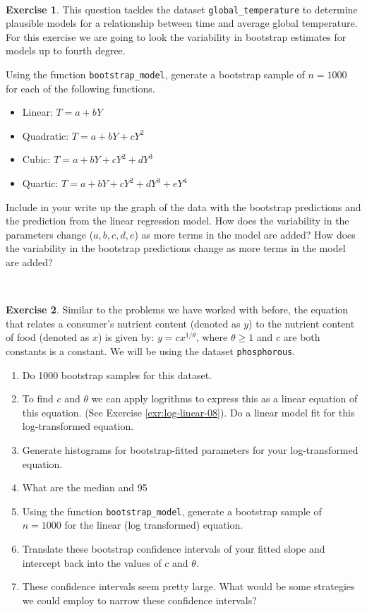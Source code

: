 \documentclass[
]{book}
\theoremstyle{definition}
\theoremstyle{definition}
\theoremstyle{definition}
\newtheorem{exercise}{Exercise}[chapter]
\theoremstyle{remark}
\begin{document}
~
\begin{exercise}
\protect\hypertarget{exr:unnamed-chunk-201}{}{\label{exr:unnamed-chunk-201} }This question tackles the dataset \texttt{global\_temperature} to determine plausible models for a relationship between time and average global temperature. For this exercise we are going to look the variability in bootstrap estimates for models up to fourth degree.

Using the function \texttt{bootstrap\_model}, generate a bootstrap sample of \(n=1000\) for each of the following functions.

\begin{itemize}
     \item Linear: $T=a+bY$
     \item Quadratic:  $T=a+bY+cY^{2}$
     \item Cubic: $T=a+bY+cY^{2}+dY^{3}$
     \item Quartic: $T=a+bY+cY^{2}+dY^{3}+eY^{4}$
\end{itemize}

Include in your write up the graph of the data with the bootstrap predictions and the prediction from the linear regression model. How does the variability in the parameters change (\(a,b,c,d,e\)) as more terms in the model are added? How does the variability in the bootstrap predictions change as more terms in the model are added?
\end{exercise}

~
\begin{exercise}
\protect\hypertarget{exr:unnamed-chunk-202}{}{\label{exr:unnamed-chunk-202} }Similar to the problems we have worked with before, the equation that relates a consumer's nutrient content (denoted as \(y\)) to the nutrient content of food (denoted as \(x\)) is given by: \(\displaystyle y = c x^{1/\theta}\), where \(\theta \geq 1\) and \(c\) are both constants is a constant. We will be using the dataset \texttt{phosphorous}.

\begin{enumerate}
\item Do 1000 bootstrap samples for this dataset.
\item To find $c$ and $\theta$ we can apply logrithms to express this as a linear equation of this equation.  (See Exercise \ref{exr:log-linear-08}). Do a linear model fit for this log-transformed equation.
\item Generate histograms for bootstrap-fitted parameters for your log-transformed equation.
\item What are the median and 95%
\item Using the function \texttt{bootstrap\_model}, generate a bootstrap sample of $n=1000$ for the linear (log transformed) equation.
\item Translate these bootstrap confidence intervals of your fitted slope and intercept back into the values of $c$ and $\theta$.
\item These confidence intervals seem pretty large.  What would be some strategies we could employ to narrow these confidence intervals?
\end{enumerate}
\end{exercise}
\end{document}
